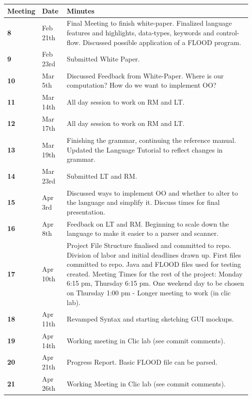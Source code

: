 \documentclass[12pt]{report}
\begin{document}
\begin{flushleft}
\begin{singlespace}
\begin{tabular}{ | p{2cm} | p{1.8cm} | p{12cm} | }
\hline
\textbf{Meeting} & \textbf{Date} & \textbf{Minutes}\\
\hline
\textbf{8} & Feb 21th & Final Meeting to finish white-paper. Finalized language features and highlights, data-types, keywords and control-flow. Discussed possible application of a FLOOD program.\\
\hline
\textbf{9} & Feb 23rd & Submitted White Paper.\\
\hline
\textbf{10} & Mar 5th & Discussed Feedback from White-Paper. Where is our computation? How do we want to implement OO?\\
\hline
\textbf{11} & Mar 14th & All day session to work on RM and LT.\\
\hline
\textbf{12} & Mar 17th & All day session to work on RM and LT.\\
\hline
\textbf{13} & Mar 19th & Finishing the grammar, continuing the reference manual. Updated the Language Tutorial to reflect changes in grammar.\\
\hline
\textbf{14} & Mar 23rd & Submitted LT and RM.\\
\hline
\textbf{15} & Apr 3rd & Discussed ways to implement OO and whether to alter to the language and simplify it. Discuss times for final presentation.\\
\hline
\textbf{16} & Apr 8th & Feedback on LT and RM. Beginning to scale down the language to make it easier to a parser and scanner.\\
\hline
\textbf{17} & Apr 10th & Project File Structure finalised and committed to repo. Division of labor and initial deadlines drawn up. First files committed to repo. Java and FLOOD files used for testing created. Meeting Times for the rest of the project: Monday 6:15 pm, Thursday 6:15 pm. One weekend day to be chosen on Thursday 1:00 pm - Longer meeting to work (in clic lab).\\
\hline
\textbf{18} & Apr 11th & Revamped Syntax and starting sketching GUI mockups.\\
\hline
\textbf{19} & Apr 14th & Working meeting in Clic lab (see commit comments).\\
\hline
\textbf{20} & Apr 21th & Progress Report. Basic FLOOD file can be parsed.\\
\hline
\textbf{21} & Apr 26th & Working Meeting in Clic lab (see commit comments).\\

\end{tabular}
\end{singlespace}
\end{flushleft}
\end{document}
